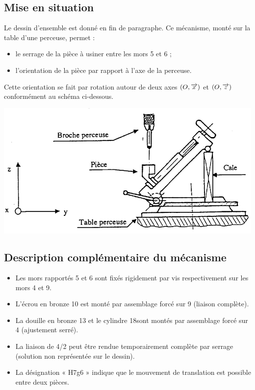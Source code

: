 \documentclass[10pt,fleqn]{article} %
\begin{document}

\vspace{10cm}
\pagestyle{fancy}
\thispagestyle{plain}


\def\columnseprulecolor{\color{ocre}}
\setlength{\columnseprule}{0.4pt} 
\begin{multicols}{2}
\subsection*{Mise en situation}

Le dessin d’ensemble est donné en fin de paragraphe.
Ce mécanisme, monté sur la table d’une perceuse, permet :
\begin{itemize}
\item le serrage de la pièce à usiner entre les mors 5 et 6 ;
\item l’orientation de la pièce par rapport à l’axe de la perceuse.
\end{itemize}
Cette orientation se fait par rotation autour de deux axes $\left(O,\overrightarrow{x}\right)$ et $\left(O,\overrightarrow{z}\right)$ conformément au schéma ci-dessous.

\begin{center}
\includegraphics[width=\linewidth]{images/fig_01}
\end{center}


\subsection*{Description complémentaire du mécanisme}
\begin{itemize}
\item Les mors rapportés 5 et 6 sont fixés rigidement par vis respectivement sur les mors 4 et 9.
\item L’écrou en bronze 10 est monté par assemblage forcé sur 9 (liaison complète).
\item La douille en bronze 13 et le cylindre 18sont montés par assemblage forcé sur 4 (ajustement serré).
\item La liaison de 4/2 peut être rendue temporairement complète par serrage (solution non représentée sur le
dessin).
\item La désignation « H7g6 » indique que le mouvement de translation est possible entre deux pièces. 
\end{itemize}


\end{multicols}
\end{document}
